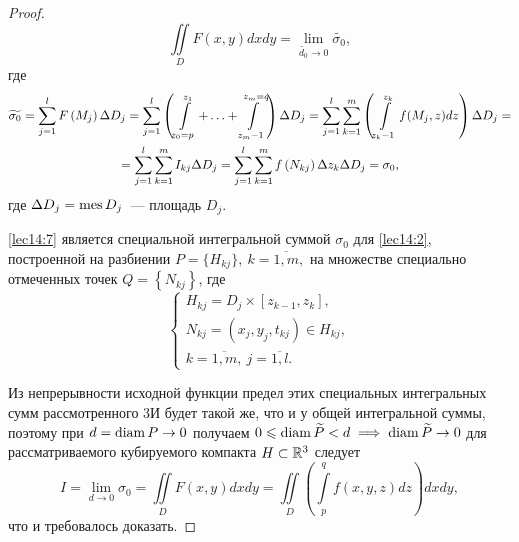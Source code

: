 \documentclass[../../main.tex]{subfiles}
\begin{document}
\begin{proof}
		\begin{equation}
		\iint\limits_D F\left(x, y\right) dxdy = \lim\limits_{\widetilde{d_0} 
		\to 0} \widetilde{\sigma_0}, \label{lec14:6}
		\end{equation}
		где 
		\begin{equation}
		\begin{gathered}
		\widetilde{\sigma_0} = \sum\limits_{j = 1}^{l} F\left(M_j\right) \Delta 
		D_j = \sum\limits_{j = 1}^{l}
		\left(\int\limits_{z_0 = p}^{z_1} + \ldots + \int\limits_{z_m - 
		1}^{z_m = q} \right)\Delta D_j = \sum\limits_{j = 1}^{l} \sum\limits_{k = 1}^{m} 
		\left(\int\limits_{z_k - 1}^{z_k} f(M_j, z)dz\right) \Delta D_j = \\ 
		= \sum\limits_{j = 1}^{l} \sum\limits_{k = 1}^{m} I_{kj} \Delta D_j = 
		\sum\limits_{j = 1}^{l} \sum\limits_{k = 1}^{m} f\left(N_{kj}\right) \Delta 
		z_k \Delta D_j = \sigma_0, \label{lec14:7}
		\end{gathered}
		\end{equation}
		где $\Delta D_j = \operatorname{mes} D_j$~--- площадь $D_j$.
		
		\eqref{lec14:7} является специальной интегральной суммой $\sigma_0$ для 
		\eqref{lec14:2}, построенной на разбиении $P = \{ H_{kj} \},\ k = 
		\overline{1, m},$ на множестве специально отмеченных точек $Q = \left\{ 
		N_{kj}\right\}$, где 
		\[
		\begin{cases}
		H_{kj} = D_j \times \left[z_{k - 1}, z_k\right],\\
		N_{kj} = (x_j, y_j, t_{kj}) \in H_{kj}, \\
		k = \overline{1, m}, \ j = \overline{1, l}.
		\end{cases} 
		\]
		
		Из непрерывности исходной функции предел этих специальных интегральных сумм 
		рассмотренного 3И будет такой же, что и у общей интегральной суммы, поэтому 
		при $d = \operatorname{diam} P \to 0$ получаем $0 \leqslant \operatorname{diam} \widetilde{P} < d \implies 
		\operatorname{diam} \widetilde{P} 
		\to 0$ для рассматриваемого кубируемого компакта $H \subset \mathbb{R}^3$ следует
		\begin{equation}
		I = \lim\limits_{d \to 0} \sigma_0 = \iint\limits_D  F\left(x, y\right) dxdy 
		= 
		\iint\limits_D \left(\int\limits_{p}^{q} f(x, y,z) dz\right) 
		dxdy, \label{lec14:9}
		\end{equation}
		что и требовалось доказать.
	\end{proof}
	
\end{document}
